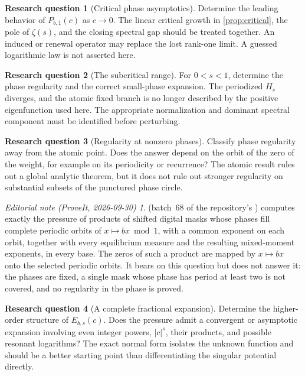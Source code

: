 \documentclass[11pt,a4paper]{article}
\numberwithin{equation}{section}
\theoremstyle{definition}
\newtheorem{question}{Research question}
\theoremstyle{remark}
\newtheorem*{ednote}{Editorial note (ProveIt, 2026-09-30)}
\begin{document}
\begin{question}[Critical phase asymptotics]
Determine the leading behavior of $P_{b,1}(c)$ as $c\to0$. The linear
critical growth in \cref{prop:critical}, the pole of $\zeta(s)$, and the
closing spectral gap should be treated together. An induced or renewal
operator may replace the lost rank-one limit. A guessed logarithmic law
is not asserted here.
\end{question}

\begin{question}[The subcritical range]
For $0<s<1$, determine the phase regularity and the correct small-phase
expansion. The periodized $H_s$ diverges, and the atomic fixed branch is
no longer described by the positive eigenfunction used here. The
appropriate normalization and dominant spectral component must be
identified before perturbing.
\end{question}

\begin{question}[Regularity at nonzero phases]
Classify phase regularity away from the atomic point. Does the answer
depend on the orbit of the zero of the weight, for example on its
periodicity or recurrence? The atomic result rules out a global analytic
theorem, but it does not rule out stronger regularity on substantial
subsets of the punctured phase circle.
\end{question}
\begin{ednote}
 (batch~68 of
the repository's ) computes exactly the pressure of
products of shifted digital masks whose phases fill complete periodic
orbits of $x\mapsto bx\bmod1$, with a common exponent on each orbit,
together with every equilibrium measure and the resulting mixed-moment
exponents, in every base. The zeros of such a product are mapped by $x\mapsto bx$ onto the selected periodic orbits. It bears on this question but does not
answer it: the phases are fixed, a single mask whose phase has period at
least two is not covered, and no regularity in the phase is proved.
\end{ednote}

\begin{question}[A complete fractional expansion]
Determine the higher-order structure of $E_{b,s}(c)$. Does the pressure
admit a convergent or asymptotic expansion involving even integer powers,
$|c|^s$, their products, and possible resonant logarithms? The exact
normal form isolates the unknown function and should be a better starting
point than differentiating the singular potential directly.
\end{question}
\end{document}
